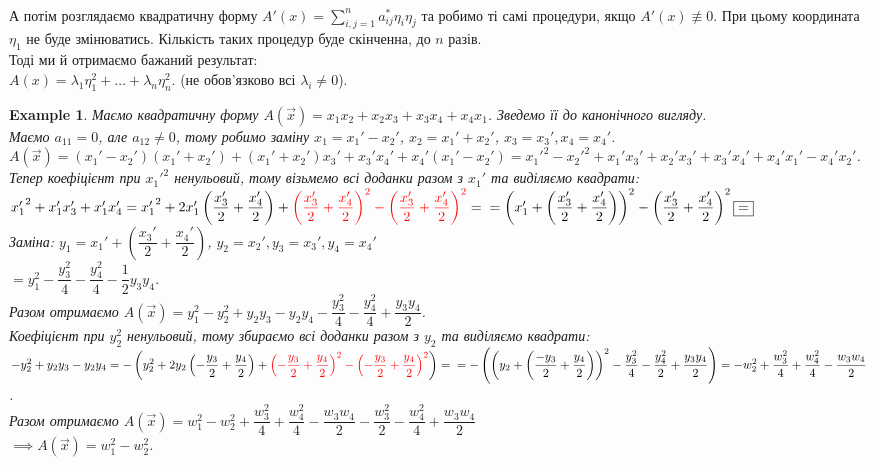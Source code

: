 \documentclass[a4paper, 10pt]{article}
\theoremstyle{theoremdd}
\newtheorem{example}[theorem]{Example}
\begin{document}
\bigskip \\
А потім розглядаємо квадратичну форму $A'(x) = \displaystyle\sum_{i,j=1}^n a_{ij}^* \eta_i \eta_j$ та робимо ті самі процедури, якщо $A'(x) \not\equiv 0$. При цьому координата $\eta_1$ не буде змінюватись. Кількість таких процедур буде скінченна, до $n$ разів.\\
Тоді ми й отримаємо бажаний результат:\\
$A(x) = \lambda_1 \eta_1^2 + \dots + \lambda_n \eta_n^2$. (не обов'язково всі $\lambda_i \neq 0$).

\begin{example}
Маємо квадратичну форму $A(\vec{x}) = x_1 x_2 + x_2 x_3 + x_3 x_4 + x_4 x_1$. Зведемо її до канонічного вигляду.\\
Маємо $a_{11} = 0$, але $a_{12} \neq 0$, тому робимо заміну $x_1 = x_1' - x_2'$, $x_2 = x_1' + x_2'$, $x_3 = x_3', x_4 = x_4'$.\\
$A(\vec{x}) = (x_1'-x_2')(x_1'+x_2') + (x_1'+x_2')x_3' + x_3' x_4' + x_4' (x_1' - x_2') = {x_1'}^2 - {x_2'}^2 + x_1'x_3' + x_2'x_3' + x_3' x_4' + x_4' x_1' - x_4' x_2'$.\\
Тепер коефіцієнт при ${x_1'}^2$ ненульовий, тому візьмемо всі доданки разом з $x_1'$ та виділяємо квадрати:\\
${x_1'}^2 + x_1'x_3' + x_1'x_4' = {x_1'}^2 + 2 x_1' \left( \dfrac{x_3'}{2} + \dfrac{x_4'}{2} \right) + \textcolor{red}{\left( \dfrac{x_3'}{2} + \dfrac{x_4'}{2} \right)^2 - \left(\dfrac{x_3'}{2} + \dfrac{x_4'}{2} \right)^2} = \\
= \left( x_1' + \left( \dfrac{x_3'}{2} + \dfrac{x_4'}{2} \right) \right)^2 - \left( \dfrac{x_3'}{2} + \dfrac{x_4'}{2} \right)^2 \boxed{=}$\\
Заміна: $y_1 = x_1' + \left( \dfrac{x_3'}{2} + \dfrac{x_4'}{2} \right)$, $y_2 = x_2', y_3 = x_3', y_4 = x_4'$\\
$\boxed{=} y_1^2  - \dfrac{y_3^2}{4} - \dfrac{y_4^2}{4} - \dfrac{1}{2}y_3y_4$.\\
Разом отримаємо $A(\vec{x}) = y_1^2 - y_2^2 + y_2y_3 - y_2y_4 - \dfrac{y_3^2}{4} - \dfrac{y_4^2}{4} + \dfrac{y_3y_4}{2}$.\\
Коефіцієнт при $y_2^2$ ненульовий, тому збираємо всі доданки разом з $y_2$ та виділяємо квадрати:\\
$-y_2^2 + y_2y_3 - y_2y_4 = -\left(y_2^2 +2y_2 \left( -\dfrac{y_3}{2} + \dfrac{y_4}{2} \right) + \textcolor{red}{\left( -\dfrac{y_3}{2} + \dfrac{y_4}{2} \right)^2 - \left( -\dfrac{y_3}{2} + \dfrac{y_4}{2} \right)^2} \right) = \\ 
= - \left( \left( y_2 + \left( \dfrac{-y_3}{2} + \dfrac{y_4}{2} \right) \right)^2 - \dfrac{y_3^2}{4} - \dfrac{y_4^2}{2} + \dfrac{y_3y_4}{2} \right) = -w_2^2 + \dfrac{w_3^2}{4} + \dfrac{w_4^2}{4} - \dfrac{w_3 w_4}{2}$.\\
Разом отримаємо $A(\vec{x}) = w_1^2 - w_2^2 + \dfrac{w_3^2}{4} + \dfrac{w_4^2}{4} - \dfrac{w_3w_4}{2} - \dfrac{w_3^2}{2} - \dfrac{w_4^2}{4} + \dfrac{w_3w_4}{2}$\\
$\implies A(\vec{x}) = w_1^2 - w_2^2$.
\end{example}
\end{document}
